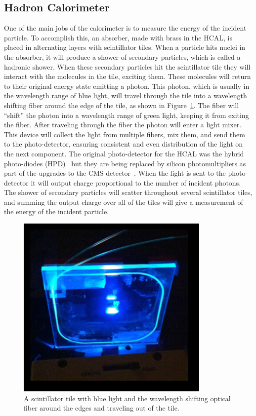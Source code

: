 \subsection{Hadron Calorimeter} \label{HCAL}
One of the main jobs of the calorimeter is to measure the energy of the incident particle. To accomplish this, an absorber, made with brass in the HCAL, is placed in alternating layers with scintillator tiles. When a particle hits nuclei in the absorber, it will produce a shower of secondary particles, which is called a hadronic shower. When these secondary particles hit the scintillator tile they will interact with the molecules in the tile, exciting them. These molecules will return to their original energy state emitting a photon. This photon, which is usually in the wavelength range of blue light, will travel through the tile into a wavelength shifting fiber around the edge of the tile, as shown in Figure~\ref{fig:Tile}. The fiber will ``shift'' the photon into a wavelength range of green light, keeping it from exiting the fiber. After traveling through the fiber the photon will enter a light mixer. This device will collect the light from multiple fibers, mix them, and send them to the photo-detector, ensuring consistent and even distribution of the light on the next component. The original photo-detector for the HCAL was the hybrid photo-diodes (HPD)~\cite{HPD} but they are being replaced by silicon photomultipliers as part of the upgrades to the CMS detector~\cite{HCALPhase1}. When the light is sent to the photo-detector it will output charge proportional to the number of incident photons. The shower of secondary particles will scatter throughout several scintillator tiles, and summing the output charge over all of the tiles will give a measurement of the energy of the incident particle. 
\begin{figure}
\centering
\includegraphics[width=0.6\linewidth]{Figures/Tile.png}
\caption{A scintillator tile with blue light and the wavelength shifting optical fiber around the edges and traveling out of the tile.}
\label{fig:Tile}
\end{figure}


